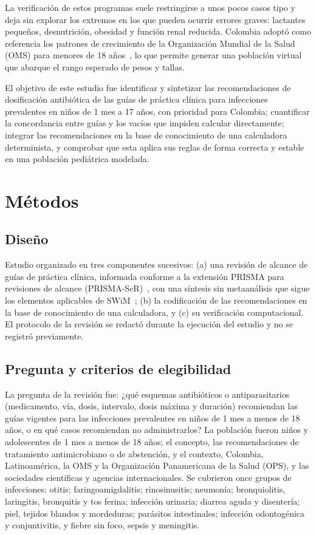 \documentclass[11pt,a4paper]{article}
\begin{document}
La verificación de estos programas suele restringirse a unos pocos casos tipo y deja sin explorar los extremos en los que pueden ocurrir errores graves: lactantes pequeños, desnutrición, obesidad y función renal reducida. Colombia adoptó como referencia los patrones de crecimiento de la Organización Mundial de la Salud (OMS) para menores de 18 años~\citep{res2465}, lo que permite generar una población virtual que abarque el rango esperado de pesos y tallas.

El objetivo de este estudio fue identificar y sintetizar las recomendaciones de dosificación antibiótica de las guías de práctica clínica para infecciones prevalentes en niños de 1 mes a 17 años, con prioridad para Colombia; cuantificar la concordancia entre guías y los vacíos que impiden calcular directamente; integrar las recomendaciones en la base de conocimiento de una calculadora determinista, y comprobar que esta aplica sus reglas de forma correcta y estable en una población pediátrica modelada.

\section{Métodos}

\subsection{Diseño}

Estudio organizado en tres componentes sucesivos: (a) una revisión de alcance de guías de práctica clínica, informada conforme a la extensión PRISMA para revisiones de alcance (PRISMA-ScR)~\citep{tricco2018}, con una síntesis sin metaanálisis que sigue los elementos aplicables de SWiM~\citep{campbell2020}; (b) la codificación de las recomendaciones en la base de conocimiento de una calculadora, y (c) su verificación computacional. El protocolo de la revisión se redactó durante la ejecución del estudio y no se registró previamente.

\subsection{Pregunta y criterios de elegibilidad}

La pregunta de la revisión fue: ¿qué esquemas antibióticos o antiparasitarios (medicamento, vía, dosis, intervalo, dosis máxima y duración) recomiendan las guías vigentes para las infecciones prevalentes en niños de 1 mes a menos de 18 años, o en qué casos recomiendan no administrarlos? La población fueron niños y adolescentes de 1 mes a menos de 18 años; el concepto, las recomendaciones de tratamiento antimicrobiano o de abstención, y el contexto, Colombia, Latinoamérica, la OMS y la Organización Panamericana de la Salud (OPS), y las sociedades científicas y agencias internacionales. Se cubrieron once grupos de infecciones: otitis; faringoamigdalitis; rinosinusitis; neumonía; bronquiolitis, laringitis, bronquitis y tos ferina; infección urinaria; diarrea aguda y disentería; piel, tejidos blandos y mordeduras; parásitos intestinales; infección odontogénica y conjuntivitis, y fiebre sin foco, sepsis y meningitis.
\end{document}
